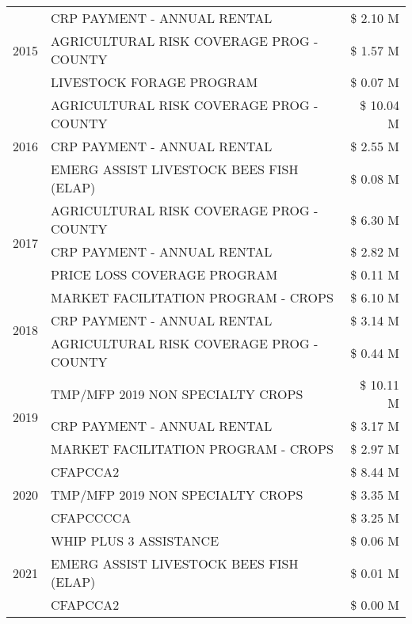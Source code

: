 \begin{tabular}{llr}
\multirow[t]{3}{*}{2015} & CRP PAYMENT - ANNUAL RENTAL & \$ 2.10 M \\
 & AGRICULTURAL RISK COVERAGE PROG - COUNTY & \$ 1.57 M \\
 & LIVESTOCK FORAGE PROGRAM & \$ 0.07 M \\
\cline{1-3}
\multirow[t]{3}{*}{2016} & AGRICULTURAL RISK COVERAGE PROG - COUNTY & \$ 10.04 M \\
 & CRP PAYMENT - ANNUAL RENTAL & \$ 2.55 M \\
 & EMERG ASSIST LIVESTOCK BEES FISH (ELAP) & \$ 0.08 M \\
\cline{1-3}
\multirow[t]{3}{*}{2017} & AGRICULTURAL RISK COVERAGE PROG - COUNTY & \$ 6.30 M \\
 & CRP PAYMENT - ANNUAL RENTAL & \$ 2.82 M \\
 & PRICE LOSS COVERAGE PROGRAM & \$ 0.11 M \\
\cline{1-3}
\multirow[t]{3}{*}{2018} & MARKET FACILITATION PROGRAM - CROPS & \$ 6.10 M \\
 & CRP PAYMENT - ANNUAL RENTAL & \$ 3.14 M \\
 & AGRICULTURAL RISK COVERAGE PROG - COUNTY & \$ 0.44 M \\
\cline{1-3}
\multirow[t]{3}{*}{2019} & TMP/MFP 2019 NON SPECIALTY CROPS & \$ 10.11 M \\
 & CRP PAYMENT - ANNUAL RENTAL & \$ 3.17 M \\
 & MARKET FACILITATION PROGRAM - CROPS & \$ 2.97 M \\
\cline{1-3}
\multirow[t]{3}{*}{2020} & CFAPCCA2 & \$ 8.44 M \\
 & TMP/MFP 2019 NON SPECIALTY CROPS & \$ 3.35 M \\
 & CFAPCCCCA & \$ 3.25 M \\
\cline{1-3}
\multirow[t]{3}{*}{2021} & WHIP PLUS 3 ASSISTANCE & \$ 0.06 M \\
 & EMERG ASSIST LIVESTOCK BEES FISH (ELAP) & \$ 0.01 M \\
 & CFAPCCA2 & \$ 0.00 M \\
\cline{1-3}
\bottomrule
\end{tabular}
